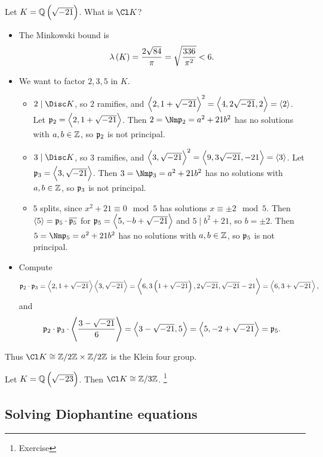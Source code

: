 \begin{example*}
Let $ K = \QQ\br{\sqrt{-21}} $. What is $ \Cl K $?
\begin{itemize}
\item The Minkowski bound is
$$ \lambda\br{K} = \dfrac{2\sqrt{84}}{\pi} = \sqrt{\dfrac{336}{\pi^2}} < 6. $$

\pagebreak

\item We want to factor $ 2, 3, 5 $ in $ K $.
\begin{itemize}
\item $ 2 \mid \Disc K $, so $ 2 $ ramifies, and $ \left\langle 2, 1 + \sqrt{-21} \right\rangle^2 = \left\langle 4, 2\sqrt{-21}, 2 \right\rangle = \left\langle 2 \right\rangle $. Let $ \mathfrak{p}_2 = \left\langle 2, 1 + \sqrt{-21} \right\rangle $. Then $ 2 = \Nm \ppp_2 = a^2 + 21b^2 $ has no solutions with $ a, b \in \mathbb{Z} $, so $ \mathfrak{p}_2 $ is not principal.
\item $ 3 \mid \Disc K $, so $ 3 $ ramifies, and $ \left\langle 3, \sqrt{-21} \right\rangle^2 = \left\langle 9, 3\sqrt{-21}, -21 \right\rangle = \left\langle 3 \right\rangle $. Let $ \mathfrak{p}_3 = \left\langle 3, \sqrt{-21} \right\rangle $. Then $ 3 = \Nm \ppp_3 = a^2 + 21b^2 $ has no solutions with $ a, b \in \mathbb{Z} $, so $ \mathfrak{p}_3 $ is not principal.
\item $ 5 $ splits, since $ x^2 + 21 \equiv 0 \mod 5 $ has solutions $ x \equiv \pm 2 \mod 5 $. Then $ \left\langle 5 \right\rangle = \mathfrak{p}_5 \cdot \overline{\mathfrak{p}_5} $ for $ \mathfrak{p}_5 = \left\langle 5, -b + \sqrt{-21} \right\rangle $ and $ 5 \mid b^2 + 21 $, so $ b = \pm 2 $. Then $ 5 = \Nm \ppp_5 = a^2 + 21b^2 $ has no solutions with $ a, b \in \mathbb{Z} $, so $ \mathfrak{p}_5 $ is not principal.
\end{itemize}
\item Compute
$$ \ppp_2 \cdot \ppp_3 = \abr{2, 1 + \sqrt{-21}}\abr{3, \sqrt{-21}} = \abr{6, 3\br{1 + \sqrt{-21}}, 2\sqrt{-21}, \sqrt{-21} - 21} = \abr{6, 3 + \sqrt{-21}}, $$
and
$$ \mathfrak{p}_2 \cdot \mathfrak{p}_3 \cdot \left\langle \dfrac{3 - \sqrt{-21}}{6} \right\rangle = \left\langle 3 - \sqrt{-21}, 5 \right\rangle = \left\langle 5, -2 + \sqrt{-21} \right\rangle = \mathfrak{p}_5. $$
\end{itemize}
Thus $ \Cl K \cong \ZZ / 2\ZZ \times \ZZ / 2\ZZ $ is the Klein four group.
\end{example*}

\begin{example*}
Let $ K = \QQ\br{\sqrt{-23}} $. Then $ \Cl K \cong \ZZ / 3\ZZ $. \footnote{Exercise}
\end{example*}

\subsection{Solving Diophantine equations}

